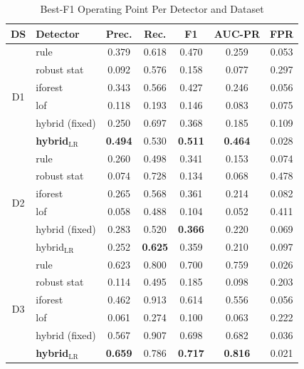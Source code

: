 \documentclass{ieeeaccess}
\begin{document}
\begin{table}[tbp]
\centering
\caption{Best-F1 Operating Point Per Detector and Dataset}
\label{tab:perdetector}
\small
\begin{tabular}{|c|l|c|c|c|c|c|}
\hline
\textbf{DS} & \textbf{Detector} & \textbf{Prec.} & \textbf{Rec.} & \textbf{F1}
  & \textbf{AUC-PR} & \textbf{FPR} \\
\hline
\multirow{6}{*}{D1}
 & rule              & 0.379 & 0.618 & 0.470 & 0.259 & 0.053 \\
 & robust stat       & 0.092 & 0.576 & 0.158 & 0.077 & 0.297 \\
 & iforest           & 0.343 & 0.566 & 0.427 & 0.246 & 0.056 \\
 & lof               & 0.118 & 0.193 & 0.146 & 0.083 & 0.075 \\
 & hybrid (fixed)    & 0.250 & 0.697 & 0.368 & 0.185 & 0.109 \\
 & \textbf{hybrid$_{\text{LR}}$} & \textbf{0.494} & 0.530 & \textbf{0.511} & \textbf{0.464} & 0.028 \\
\hline
\multirow{6}{*}{D2}
 & rule              & 0.260 & 0.498 & 0.341 & 0.153 & 0.074 \\
 & robust stat       & 0.074 & 0.728 & 0.134 & 0.068 & 0.478 \\
 & iforest           & 0.265 & 0.568 & 0.361 & 0.214 & 0.082 \\
 & lof               & 0.058 & 0.488 & 0.104 & 0.052 & 0.411 \\
 & hybrid (fixed)    & 0.283 & 0.520 & \textbf{0.366} & 0.220 & 0.069 \\
 & hybrid$_{\text{LR}}$ & 0.252 & \textbf{0.625} & 0.359 & 0.210 & 0.097 \\
\hline
\multirow{6}{*}{D3}
 & rule              & 0.623 & 0.800 & 0.700 & 0.759 & 0.026 \\
 & robust stat       & 0.114 & 0.495 & 0.185 & 0.098 & 0.203 \\
 & iforest           & 0.462 & 0.913 & 0.614 & 0.556 & 0.056 \\
 & lof               & 0.061 & 0.274 & 0.100 & 0.063 & 0.222 \\
 & hybrid (fixed)    & 0.567 & 0.907 & 0.698 & 0.682 & 0.036 \\
 & \textbf{hybrid$_{\text{LR}}$} & \textbf{0.659} & 0.786 & \textbf{0.717} & \textbf{0.816} & 0.021 \\
\hline
\end{tabular}
\end{table}
\end{document}
